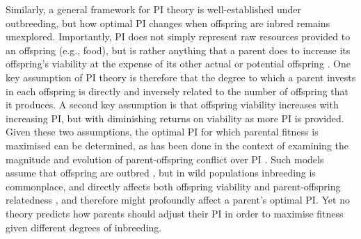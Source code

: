 \documentclass[12pt]{article}
\begin{document}
Similarly, a general framework for PI theory is well-established under outbreeding, but how optimal PI changes when offspring are inbred remains unexplored. Importantly, PI does not simply represent raw resources provided to an offspring (e.g., food), but is rather anything that a parent does to increase its offspring's viability at the expense of its other actual or potential offspring \cite[][]{Trivers1972, Trivers1974}. One key assumption of PI theory is therefore that the degree to which a parent invests in each offspring is directly and inversely related to the number of offspring that it produces. A second key assumption is that offspring viability increases with increasing PI, but with diminishing returns on viability as more PI is provided. Given these two assumptions, the optimal PI for which parental fitness is maximised can be determined, as has been done in the context of examining the magnitude and evolution of parent-offspring conflict over PI \cite[e.g.,][]{Macnair1978, Parker1978, Parker1985, DeJong2005, Kuijper2012}. Such models assume that offspring are outbred \cite[or result from self-fertilisation,][]{DeJong2005}, but in wild populations inbreeding is  commonplace, and directly affects both offspring viability and parent-offspring relatedness \cite[][]{Crnokrak1999, OGrady2006, Charlesworth2009}, and therefore might profoundly affect a parent's optimal PI. Yet no theory predicts how parents should adjust their PI in order to maximise fitness given different degrees of inbreeding. %
\end{document}
